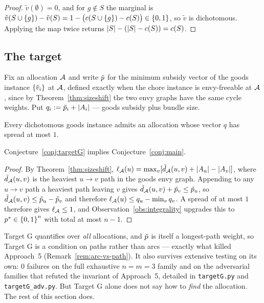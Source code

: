 \begin{proof}
$\tilde{v}(\emptyset) = 0$, and for $g \notin S$ the marginal is
$\tilde{v}(S \cup \left\{g\right\}) - \tilde{v}(S) = 1 - \big(c(S \cup \left\{g\right\}) -
c(S)\big) \in \left\{0,1\right\}$, so $\tilde{v}$ is dichotomous. Applying the map
twice returns $\left\lvert S\right\rvert - (\left\lvert S\right\rvert - c(S)) = c(S)$.
\end{proof}

\subsection{The target}

Fix an allocation $\mathcal{A}$ and write $\tilde{p}$ for the minimum subsidy
vector of the goods instance $\left\{\tilde{v}_i\right\}$ at $\mathcal{A}$, defined exactly
when the chore instance is envy-freeable at $\mathcal{A}$, since by
Theorem~\ref{thm:sizeshift} the two envy graphs have the same cycle weights.
Put $q_i := \tilde{p}_i + \left\lvert A_{i}\right\rvert$ --- goods subsidy plus bundle
size.

\begin{conjecture}[Target G]
\label{conj:targetG}
Every dichotomous goods instance admits an allocation whose vector $q$ has
spread at most $1$.
\end{conjecture}

\begin{proposition}
\label{prop:targetG-implies}
Conjecture~\ref{conj:targetG} implies Conjecture~\ref{conj:main}.
\end{proposition}

\begin{proof}
By Theorem~\ref{thm:sizeshift},
$\ell_{\mathcal{A}}(u) = \max_v [\tilde{d}_{\mathcal{A}}(u,v) + \left\lvert A_{u}\right\rvert -
\left\lvert A_{v}\right\rvert]$, where $\tilde{d}_{\mathcal{A}}(u,v)$ is the heaviest $u \to v$
path in the goods envy graph. Appending to any $u \to v$ path a heaviest path
leaving $v$ gives $\tilde{d}_{\mathcal{A}}(u,v) + \tilde{p}_v \le
\tilde{p}_u$, so $\tilde{d}_{\mathcal{A}}(u,v) \le \tilde{p}_u -
\tilde{p}_v$ and therefore $\ell_{\mathcal{A}}(u) \le q_u - \min_v q_v$. A
spread of at most $1$ therefore gives $\ell_{\mathcal{A}} \le 1$, and
Observation~\ref{obs:integrality} upgrades this to
$p^{*} \in \left\{0,1\right\}^n$ with total at most $n-1$.
\end{proof}

Target G quantifies over \emph{all} allocations, and $\tilde{p}$ is
itself a longest-path weight, so Target G is a condition on paths rather than
arcs --- exactly what killed Approach~5 (Remark~\ref{rem:arc-vs-path}). It also
survives extensive testing on its own: $0$ failures on the full exhaustive
$n=m=3$ family and on the adversarial families that refuted the invariant of
Approach~5, detailed in \texttt{targetG.py} and \texttt{targetG\_adv.py}. But
Target G alone does not say how to \emph{find} the allocation. The rest of this
section does.

